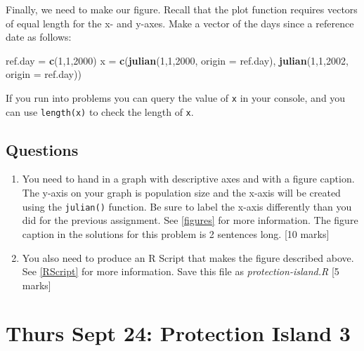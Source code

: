 \documentclass[]{book}
\newenvironment{Shaded}{\begin{snugshade}}{\end{snugshade}}
\newcommand{\KeywordTok}[1]{\textcolor[rgb]{0.13,0.29,0.53}{\textbf{{#1}}}}
\newcommand{\DataTypeTok}[1]{\textcolor[rgb]{0.13,0.29,0.53}{{#1}}}
\newcommand{\DecValTok}[1]{\textcolor[rgb]{0.00,0.00,0.81}{{#1}}}
\newcommand{\StringTok}[1]{\textcolor[rgb]{0.31,0.60,0.02}{{#1}}}
\newcommand{\NormalTok}[1]{{#1}}
\begin{document}
Finally, we need to make our figure. Recall that the plot function
requires vectors of equal length for the x- and y-axes. Make a vector of
the days since a reference date as follows:

\begin{Shaded}
\begin{Highlighting}[]
\NormalTok{ref.day =}\StringTok{ }\KeywordTok{c}\NormalTok{(}\DecValTok{1}\NormalTok{,}\DecValTok{1}\NormalTok{,}\DecValTok{2000}\NormalTok{)}
\NormalTok{x =}\StringTok{ }\KeywordTok{c}\NormalTok{(}\KeywordTok{julian}\NormalTok{(}\DecValTok{1}\NormalTok{,}\DecValTok{1}\NormalTok{,}\DecValTok{2000}\NormalTok{, }\DataTypeTok{origin =} \NormalTok{ref.day), }\KeywordTok{julian}\NormalTok{(}\DecValTok{1}\NormalTok{,}\DecValTok{1}\NormalTok{,}\DecValTok{2002}\NormalTok{, }\DataTypeTok{origin =} \NormalTok{ref.day))}
\end{Highlighting}
\end{Shaded}

If you run into problems you can query the value of \texttt{x} in your
console, and you can use \texttt{length(x)} to check the length of
\texttt{x}.

\section{Questions}\label{questions-4}

\begin{enumerate}
\def\labelenumi{\arabic{enumi}.}
\item
  You need to hand in a graph with descriptive axes and with a figure
  caption. The y-axis on your graph is population size and the x-axis
  will be created using the \texttt{julian()} function. Be sure to label
  the x-axis differently than you did for the previous assignment. See
  \ref{figures} for more information. The figure caption in the
  solutions for this problem is 2 sentences long. {[}10 marks{]}
\item
  You also need to produce an R Script that makes the figure described
  above. See \ref{RScript} for more information. Save this file as
  \emph{protection-island.R} {[}5 marks{]}
\end{enumerate}

\chapter{Thurs Sept 24: Protection Island
3}\label{thurs-sept-24-protection-island-3}
\end{document}
